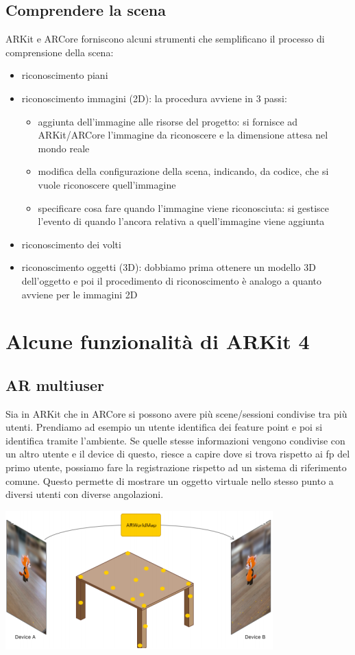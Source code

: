 \subsection{Comprendere la scena}
ARKit e ARCore forniscono alcuni strumenti che semplificano il processo di comprensione della scena:
\begin{itemize}
    \item riconoscimento piani
    \item riconoscimento immagini (2D): la procedura avviene in 3 passi:
        \begin{itemize}
            \item aggiunta dell'immagine alle risorse del progetto: si fornisce ad ARKit/ARCore l'immagine da riconoscere e la dimensione attesa nel mondo reale
            \item modifica della configurazione della scena, indicando, da codice, che si vuole riconoscere quell'immagine
            \item specificare cosa fare quando l'immagine viene riconosciuta: si gestisce l'evento di quando l'ancora relativa a quell'immagine viene aggiunta
        \end{itemize}
    \item riconoscimento dei volti
    \item riconoscimento oggetti (3D): dobbiamo prima ottenere un modello 3D dell'oggetto e poi il procedimento di riconoscimento è analogo a quanto avviene per le immagini 2D 
\end{itemize}

\section{Alcune funzionalità di ARKit 4}
\subsection{AR multiuser}
Sia in ARKit che in ARCore si possono avere più scene/sessioni condivise tra più utenti. 
Prendiamo ad esempio un utente identifica dei feature point e poi si identifica tramite l'ambiente. Se quelle stesse informazioni vengono condivise con un altro utente e il device di questo, riesce a capire dove si trova rispetto ai fp del primo utente, possiamo fare la registrazione rispetto ad un sistema di riferimento comune. Questo permette di mostrare un oggetto virtuale nello stesso punto a diversi utenti con diverse angolazioni. 
\begin{center}
    \includegraphics[width=.7\textwidth]{images/MobiDEV/5. augmented reality in pratica/ar multiuser.PNG}
\end{center}

